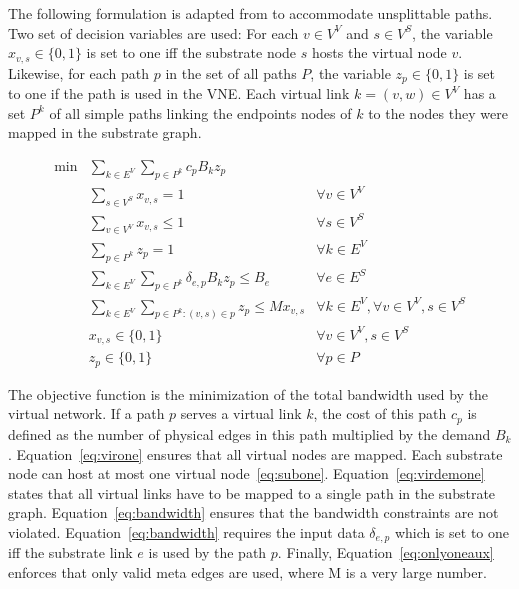 \documentclass{llncs}
\begin{document}
The following formulation is adapted from \cite{hu:2013} to accommodate unsplittable paths. 
Two set of decision variables are used: For each $v \in V^{V}$ and $s \in V^{S}$, the variable $x_{v,s} \in \{0,1\}$ is set to one iff the substrate node $s$ hosts the virtual node $v$. 
Likewise, for each path $p$ in the set of all paths $P$, the variable $z_{p} \in \{0,1\}$ is set to one if the path is used in the VNE. 
Each virtual link $k=(v,w) \in V^V$ has a set $P^k$ of all simple paths linking the endpoints nodes of $k$ to the nodes they were mapped in the substrate graph.

\begin{align}
  \min  & \sum\limits_{k \in E^{V}}\sum\limits_{p \in P^k}  c_{p} B_k z_{p} \label{eq:obj} \\
        & \sum\limits_{s \in V^{S}} x_{v,s} = 1                                  & \forall v \in V^{V} \label{eq:virone} \\
        & \sum\limits_{v \in V^{V}} x_{v,s} \leq 1                               & \forall s \in V^{S} \label{eq:subone} \\
        & \sum\limits_{p \in P^{k}} z_{p} = 1                                    & \forall k \in E^{V} \label{eq:virdemone} \\
        & \sum\limits_{k \in E^{V}}\sum\limits_{p \in P^{k}} \delta_{e,p} B_{k} z_{p} \leq B_{e} & \forall e \in E^{S} \label{eq:bandwidth} \\
        &  \sum\limits_{k \in E^{V}}\sum\limits_{p \in P^k : (v,s) \in p} z_{p} \leq M x_{v,s} & \forall k \in E^{V}, \forall v \in V^{V}, s \in V^{S} \label{eq:onlyoneaux}\\
        &  x_{v,s} \in \{0,1\}  & \forall v \in V^{V}, s \in V^{S} \nonumber \\
        & z_{p} \in \{0,1\}    & \forall p \in {P} \nonumber
\end{align}

The objective function is the minimization of the total bandwidth used by the virtual network. If a path $p$ serves a virtual link $k$, the cost of this path $c_{p}$ is defined as the number of physical edges in this path multiplied by the demand $B_{k}$.
Equation~\eqref{eq:virone} ensures that all virtual nodes are mapped. Each substrate node can host at most one virtual node~\eqref{eq:subone}.
Equation~\eqref{eq:virdemone} states that all virtual links have to be mapped to a single path in the substrate graph. Equation~\eqref{eq:bandwidth} ensures that the bandwidth constraints are not violated.
Equation~\ref{eq:bandwidth} requires the input data $\delta_{e,p}$ which is set to one iff the substrate link $e$ is used by the path $p$.
Finally, Equation~\eqref{eq:onlyoneaux} enforces that only valid meta edges are used, where M is a very large number.
\end{document}
